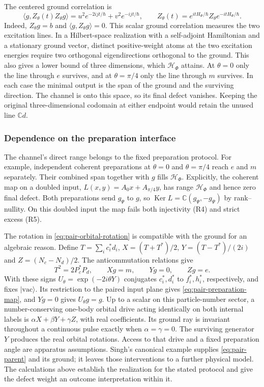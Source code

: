 \documentclass[11pt,reqno]{scrartcl}
\newcommand{\CC}{\mathbb C}
\newcommand{\scrHF}{\mathscr H_{\Phi}}
\newcommand{\ket}[1]{\lvert #1\rangle}
\newcommand{\inner}[2]{\langle #1,#2\rangle}
\DeclareMathOperator{\Ker}{Ker}
\theoremstyle{plain}
\theoremstyle{definition}
\theoremstyle{remark}
\begin{document}
The centered ground correlation is
\begin{equation}
  \inner{g}{Z_{\theta}(t)Z_{\theta}g}
  =u^2e^{-2ijt/\hbar}+v^2e^{-ijt/\hbar},\qquad
  Z_{\theta}(t)=e^{itH_{\Phi}/\hbar}Z_{\theta}e^{-itH_{\Phi}/\hbar}.
  \label{eq:pair-two-frequency-response}
\end{equation}
Indeed, $Z_{\theta}g=b$ and $\inner{g}{Z_{\theta}g}=0$.
This scalar ground correlation measures the two excitation lines.
In a Hilbert-space realization with a self-adjoint Hamiltonian and a
stationary ground vector, distinct positive-weight atoms at the two
excitation energies require two orthogonal eigendirections orthogonal
to the ground.  This also gives a lower bound of three dimensions, which
$\scrHF$ attains.  At $\theta=0$ only the line through $e$ survives,
and at $\theta=\pi/4$ only the line through $m$ survives.
In each case the minimal output is the span of the ground and the
surviving direction.  The channel is onto this space, so its final defect
vanishes.  Keeping the original three-dimensional codomain at either
endpoint would retain the unused line $\CC d$.

\subsubsection*{Dependence on the preparation interface}
The channel's direct range belongs to the fixed preparation protocol.
For example, independent coherent preparations at $\theta=0$ and
$\theta=\pi/4$ reach $e$ and $m$ separately.  Their combined span together
with $g$ fills $\scrHF$.  Explicitly, the coherent map on a doubled
input, $L(x,y)=A_0 x+A_{\pi/4}y$, has range $\scrHF$ and hence zero
final defect.  Both preparations send $g_\Psi$ to $g$, so
$\Ker L=\CC(g_\Psi,-g_\Psi)$ by rank--nullity.  On this doubled input
the map fails both injectivity (R4) and strict excess (R5).

The rotation in \eqref{eq:pair-orbital-rotation} is compatible with the
ground for an algebraic reason.  Define
$T=\sum_i c_i^*d_i$,
$X=(T+T^*)/2$, $Y=(T-T^*)/(2i)$ and
$Z=(N_c-N_d)/2$.  The anticommutation relations give
\begin{equation}
  T^2=2P_c^*P_d,\qquad Xg=m,\qquad Yg=0,\qquad Zg=e .
  \label{eq:pair-mixer-selection}
\end{equation}
With these signs $U_\theta=\exp(-2i\theta Y)$ conjugates $c_i^*,d_i^*$
to $f_i^*,h_i^*$, respectively, and fixes $\ket{\mathrm{vac}}$.
Its restriction to the paired input plane gives
\eqref{eq:pair-preparation-map}, and $Yg=0$ gives $U_\theta g=g$.
Up to a scalar on this particle-number sector, a number-conserving
one-body orbital drive acting identically on both internal labels is
$\alpha X+\beta Y+\gamma Z$, with real coefficients.  Its ground ray is invariant throughout
a continuous pulse exactly when $\alpha=\gamma=0$.  The surviving generator $Y$
produces the real orbital rotations.  Access to that drive and a fixed
preparation angle are apparatus assumptions.  Singh's canonical example
supplies \eqref{eq:pair-parent} and its ground; it leaves those
interventions to a further physical model.  The calculations above
establish the realization for the stated protocol and give the defect
weight an outcome interpretation within it.
\end{document}
